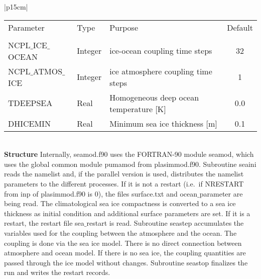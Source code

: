 \begin{center}
\begin{tabular}{|p{15cm}|}
\hline
\begin{center}
\begin{tabular}{l l p{5cm} c} %
Parameter & Type & Purpose & Default \\
&&&\\
NCPL$\_$ICE$\_$OCEAN& Integer & ice-ocean coupling time steps & 32 \\
NCPL$\_$ATMOS$\_$ICE & Integer & ice atmosphere coupling time steps & 1 \\
TDEEPSEA & Real &Homogeneous deep ocean temperature [K] & 0.0 \\
DHICEMIN & Real &  Minimum sea ice thickness [m] & 0.1 \\
\end{tabular} 
\end{center}
\vspace{3mm} \\
\hline
\vspace{2mm} {\bf Structure} Internally, {\module seamod.f90} uses the FORTRAN-90
module {\modu seamod}, which uses the global common module {\modu pumamod} from
{\module plasimmod.f90}. Subroutine {\sub seaini} reads the namelist and, if the parallel
version is used,  distributes the namelist parameters to the different processes.
If it is not a restart (i.e.~if NRESTART from {\nam inp} of {\module plasimmod.f90} is 0), the files
{\file surface.txt} and {\file ocean$\_$parameter} are being read. The climatological sea ice
compactness is converted to a sea ice thickness as initial condition and additional   surface
parameters are set. If it is a restart, the restart file {\file sea$\_$restart} is read. Subroutine
{\sub
seastep} accumulates the variables used for the coupling between the atmosphere and the
ocean.
The coupling is done via the sea ice model. There is no direct connection between
atmosphere 
and ocean model. If there is no sea ice, the coupling quantities are passed through the ice
model without changes.
Subroutine {\sub  seastop} finalizes the run and writes the restart records.
\vspace{3mm} \\
\hline
\end{tabular}
\end{center}
\newpage


